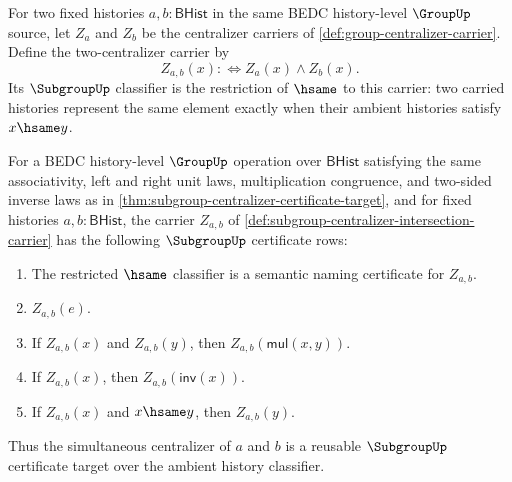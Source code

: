 \begin{definition}
\label{def:subgroup-centralizer-intersection-carrier}
For two fixed histories $a,b:\mathsf{BHist}$ in the same BEDC
history-level $\GroupUp$ source, let $Z_a$ and $Z_b$ be the centralizer
carriers of \autoref{def:group-centralizer-carrier}. Define the
two-centralizer carrier by
$$
Z_{a,b}(x) :\Longleftrightarrow Z_a(x)\land Z_b(x).
$$
Its $\SubgroupUp$ classifier is the restriction of $\hsame$ to this
carrier: two carried histories represent the same element exactly when their
ambient histories satisfy $x\hsame y$.
\end{definition}

\begin{theorem}
\label{thm:subgroup-centralizer-intersection-certificate}
For a BEDC history-level $\GroupUp$ operation over $\mathsf{BHist}$
satisfying the same associativity, left and right unit laws, multiplication
congruence, and two-sided inverse laws as in
\autoref{thm:subgroup-centralizer-certificate-target}, and for fixed histories
$a,b:\mathsf{BHist}$, the carrier $Z_{a,b}$ of
\autoref{def:subgroup-centralizer-intersection-carrier} has the following
$\SubgroupUp$ certificate rows:
\begin{enumerate}
\item The restricted $\hsame$ classifier is a semantic naming certificate for
$Z_{a,b}$.
\item $Z_{a,b}(e)$.
\item If $Z_{a,b}(x)$ and $Z_{a,b}(y)$, then
$Z_{a,b}(\mathsf{mul}(x,y))$.
\item If $Z_{a,b}(x)$, then $Z_{a,b}(\mathsf{inv}(x))$.
\item If $Z_{a,b}(x)$ and $x\hsame y$, then $Z_{a,b}(y)$.
\end{enumerate}
Thus the simultaneous centralizer of $a$ and $b$ is a reusable
$\SubgroupUp$ certificate target over the ambient history classifier.
\end{theorem}
